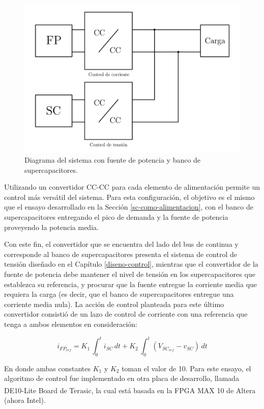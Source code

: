 \begin{figure}[hbt!]
  \centering
  \includegraphics[width=0.55\columnwidth]{Imágenes/Ensayos/Con módulos de almacenamiento/Supercapacitores/Con fuente de potencia/Diagrama del ensayo.pdf}
  \caption{Diagrama del sistema con fuente de potencia y banco de supercapacitores.}
  \label{esquema-fp-sc}
\end{figure}

Utilizando un convertidor CC-CC para cada elemento de alimentación permite un control más versátil del sistema. Para esta configuración, el objetivo es el mismo que el ensayo desarrollado en la Sección \ref{sc-como-alimentacion}, con el banco de supercapacitores entregando el pico de demanda y la fuente de potencia proveyendo la potencia media. 

Con este fin, el convertidor que se encuentra del lado del bus de continua y corresponde al banco de supercapacitores presenta el sistema de control de tensión diseñado en el Capítulo \ref{diseno-control}, mientras que el convertidor de la fuente de potencia debe mantener el nivel de tensión en los supercapacitores que establezca su referencia, y procurar que la fuente entregue la corriente media que requiera la carga (es decir, que el banco de supercapacitores entregue una corriente media nula). La acción de control planteada para este último convertidor consistió de un lazo de control de corriente con una referencia que tenga a ambos elementos en consideración:

\begin{equation}
  i_{{FP}_{ref}} = K_1 \, \int_{0}^{t} i_{SC} \, dt + K_2 \, \int_{0}^{t} (V_{{SC}_{ref}} - v_{SC}) \, dt
\end{equation}

En donde ambas constantes $K_1$ y $K_2$ toman el valor de 10. Para este ensayo, el algoritmo de control fue implementado en otra placa de desarrollo, llamada DE10-Lite Board\textsuperscript\textregistered\hspace{0.6pt} de Terasic, la cual está basada en la FPGA MAX 10 de Altera (ahora Intel). 

